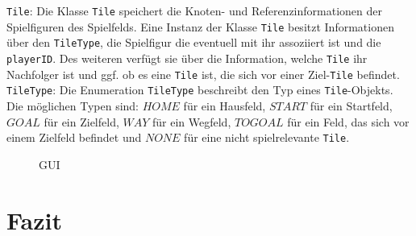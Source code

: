 \documentclass[conference]{IEEEtran}
\begin{document}
\texttt{Tile}: Die Klasse \texttt{Tile} speichert die Knoten- und Referenzinformationen der Spielfiguren des Spielfelds. Eine Instanz der Klasse \texttt{Tile} besitzt Informationen \"uber den \texttt{TileType}, die Spielfigur die eventuell mit ihr assoziiert ist und die \texttt{playerID}. Des weiteren verf\"ugt sie \"uber die Information, welche \texttt{Tile} ihr Nachfolger ist und ggf. ob es eine \texttt{Tile} ist, die sich vor einer Ziel-\texttt{Tile} befindet. \\

\texttt{TileType}: Die Enumeration \texttt{TileType} beschreibt den Typ eines \texttt{Tile}-Objekts. Die m\"oglichen Typen sind: $HOME$ f\"ur ein Hausfeld, $START$ f\"ur ein Startfeld, $GOAL$ f\"ur ein Zielfeld, $WAY$ f\"ur ein Wegfeld, $TOGOAL$ f\"ur ein Feld, das sich vor einem Zielfeld befindet und $NONE$ f\"ur eine nicht spielrelevante \texttt{Tile}. \\

\begin{figure}[]
    \centering
    \caption{GUI}
\end{figure}

\section{Fazit}
\end{document}
